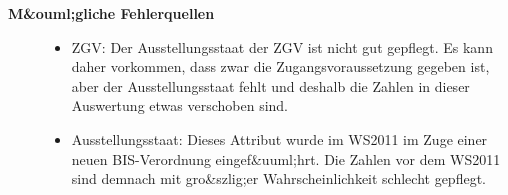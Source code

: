 \documentclass [a4paper,abstracton,titlepage]{scrartcl}
\begin{document}
  \begin{description}
\item[%
\textbf{M\&{}ouml;gliche Fehlerquellen}
]
  \begin{itemize}
\item%
ZGV: Der Ausstellungsstaat der ZGV ist nicht gut gepflegt. Es kann daher vorkommen, dass zwar die Zugangsvoraussetzung gegeben ist, aber der Ausstellungsstaat fehlt und deshalb die Zahlen in dieser Auswertung etwas verschoben sind.

\item%
Ausstellungsstaat: Dieses Attribut wurde im WS2011 im Zuge einer neuen BIS-Verordnung eingef\&{}uuml;hrt. Die Zahlen vor dem WS2011 sind demnach mit gro\&{}szlig;er Wahrscheinlichkeit schlecht gepflegt.

\end{itemize}
\end{description}
\label{footer}\hypertarget{footer}{}
\end{document}

